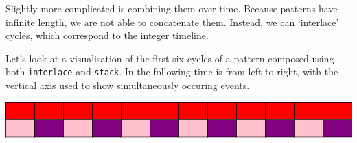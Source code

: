 Slightly more complicated is combining them over time. Because patterns
have infinite length, we are not able to concatenate them. Instead, we
can `interlace' cycles, which correspond to the integer timeline.

\begin{Shaded}
\begin{Highlighting}[]
 \OtherTok{{-}\textgreater{}} 
\OtherTok{=}   \OperatorTok{$} 

\NormalTok{ [}\NormalTok{ a] }\OtherTok{{-}\textgreater{}} 
\OtherTok{=}\OperatorTok{$} 
  \OtherTok{=}
              \OtherTok{=}  \OperatorTok{$} 
\OtherTok{=}\OperatorTok{$}
\OtherTok{=}\OperatorTok{!!} \NormalTok{ (} \NormalTok{))}
\OtherTok{=}\OperatorTok{{-}}\OperatorTok{/}
\end{Highlighting}
\end{Shaded}

Let's look at a visualisation of the first six cycles of a pattern
composed using both \texttt{interlace} and \texttt{stack}. In the
following time is from left to right, with the vertical axis used to
show simultaneously occuring events.

\begin{Shaded}
\begin{Highlighting}[]
\OtherTok{=}\NormalTok{ stack [atom }\NormalTok{, interlace [atom }\NormalTok{]]}
\end{Highlighting}
\end{Shaded}

\includegraphics{../figures/fig1.pdf}\\

